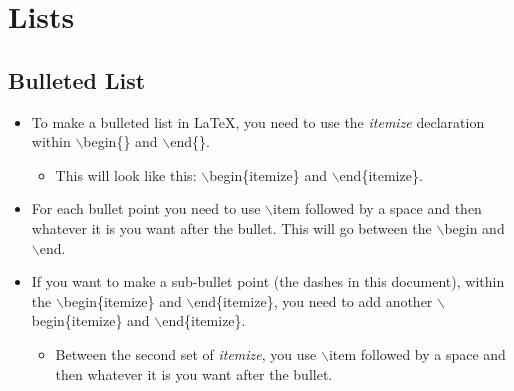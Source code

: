 \section{Lists}
	\subsection{Bulleted List}
		\begin{itemize}
			\item To make a bulleted list in \LaTeX{}, you need to use the \textit{itemize} declaration within $\backslash$begin\{\} and $\backslash$end\{\}.
			\begin{itemize}
				\item This will look like this: $\backslash$begin\{itemize\} and $\backslash$end\{itemize\}.
			\end{itemize}
			\item For each bullet point you need to use $\backslash$item followed by a space and then whatever it is you want after the bullet. This will go between the $\backslash$begin and $\backslash$end.
			\item If you want to make a sub-bullet point (the dashes in this document), within the $\backslash$begin\{itemize\} and $\backslash$end\{itemize\}, you need to add another $\backslash$begin\{itemize\} and $\backslash$end\{itemize\}.
			\begin{itemize}
				\item Between the second set of \textit{itemize}, you  use $\backslash$item followed by a space and then whatever it is you want after the bullet.
			\end{itemize}
		\end{itemize}

